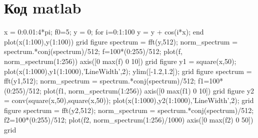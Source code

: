 \documentclass[10pt,a4paper]{report}
\begin{document}
\section{Код matlab}
x = 0:0.01:4*pi;\newline
f0=5;\newline
y = 0;\newline
for i=0:1:100\newline
    y = y + cos(i*x);\newline
end \newline
plot(x(1:100),y(1:100))\newline
grid\newline
figure\newline
spectrum = fft(y,512);\newline
norm_spectrum = spectrum.*conj(spectrum)/512;\newline
f=100*(0:255)/512;\newline
plot(f, norm_spectrum(1:256))\newline
axis([0 max(f) 0 10])\newline
grid\newline
figure\newline
y1 = square(x,50);\newline
plot(x(1:1000),y1(1:1000),'LineWidth',2);\newline
ylim([-1.2,1.2]);\newline
grid\newline
figure\newline
spectrum = fft(y1,512);\newline
norm_spectrum = spectrum.*conj(spectrum)/512;\newline
f1=100*(0:255)/512;\newline
plot(f1, norm_spectrum(1:256))\newline
axis([0 max(f1) 0 10])\newline
grid\newline
figure\newline
y2 = conv(square(x,50),square(x,50));\newline
plot(x(1:1000),y2(1:1000),'LineWidth',2);\newline
grid\newline
figure\newline
spectrum = fft(y2,512);\newline
norm_spectrum = spectrum.*conj(spectrum)/512;\newline
f2=100*(0:255)/512;\newline
plot(f2, norm_spectrum(1:256)/1000)\newline
axis([0 max(f2) 0 50])\newline
grid\newline
\end{document}

